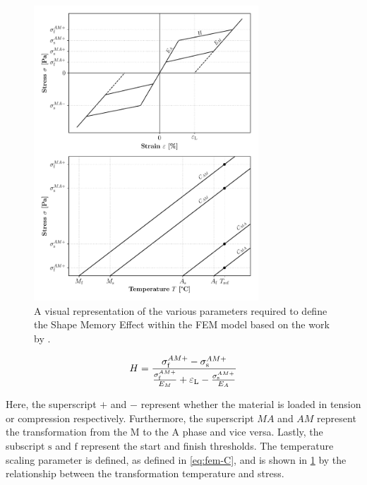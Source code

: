 \begin{figure}[hbt!]
    \centering
    \includegraphics[width=0.75\textwidth]{images/chap2/fem-wp-graph.pdf}
    \caption[A visual representation of the various parameters required to define the Shape Memory Effect within the FEM model]{A visual representation of the various parameters required to define the Shape Memory Effect within the FEM model based on the work by \cite{jaberAnsysParametersShape2018}.}
    \label{fig:fem-wp-graph}
\end{figure}

\begin{equation}
    \label{eq:fem-h}
    H = \frac{\sigma_\mathrm{f}^{AM+}-\sigma_\mathrm{s}^{AM+}}{\frac{\sigma_\mathrm{f}^{AM+}}{E_M}+\varepsilon_\mathrm{L}-\frac{\sigma_\mathrm{s}^{AM+}}{E_A}}
\end{equation}

Here, the superscript $+$ and $-$ represent whether the material is loaded in tension or compression respectively. Furthermore, the superscript $MA$ and $AM$ represent the transformation from the M to the A phase and vice versa. Lastly, the subscript $\mathrm{s}$ and $\mathrm{f}$ represent the start and finish thresholds. The temperature scaling parameter is defined, as defined in \cref{eq:fem-C}, and is shown in \cref{fig:fem-wp-graph} by the relationship between the transformation temperature and stress.


